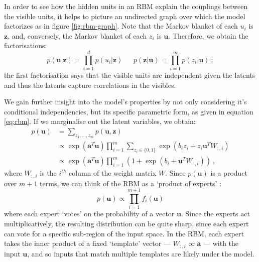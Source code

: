 \documentclass[11pt, oneside]{article}
\renewcommand{\u}{{\mathbf u}}
\newcommand{\z}{{\mathbf z}}
\theoremstyle{definition}
\begin{document}
In order to see how the hidden units in an RBM explain the couplings between the visible units, it helps to picture an undirected graph over which the model factorizes as in figure \ref{fig:rbm-graph}. Note that the Markov blanket of each $u_i$ is $\z$, and, conversely, the Markov blanket of each $z_i$ is $\u$. Therefore, we obtain the factorisations:
\begin{equation}
    p(\u | \z) = \prod_{i=1}^d p(u_i | \z)  \ \ \ \ \ \ \ p(\z | \u) = \prod_{i=1}^m p(z_i | \u) \ ;
    \label{eq: rbm conditional indpendicies}
\end{equation}
the first factorisation says that the visible units are independent given the latents and thus the latents capture correlations in the visibles.

We gain further insight into the model's properties by not only considering it's conditional independencies, but its specific parametric form, as given in equation \ref{eq:rbm}. If we marginalise out the latent variables, we obtain:
\begin{align}
    p(\u) &= \sum_{z_1, ..., z_m} p(\u, \z) \\
          &\propto \exp(\textbf{a}^T\u) \prod_{i=1}^m \sum_{z_i \in \{0, 1\}} \exp(b_i z_i + z_i \u^T W_{:, i}) \\
          &\propto \exp(\textbf{a}^T\u) \prod_{i=1}^m (1 + \exp(b_i + \u^T W_{:, i})) \ ,
          \label{eq:marginal of rbm}
\end{align}
where $W_{:, i}$ is the $i^{th}$ column of the weight matrix $W$. Since $p(\u)$ is a product over $m+1$ terms, we can think of the RBM as a `product of experts' \citep{hinton2006training}:
\begin{equation}
    p(\u) \propto \prod_{i=1}^{m+1} f_i(\u)
\end{equation}
where each expert `votes' on the probability of a vector $\u$. Since the experts act multiplicatively, the resulting distribution can be quite sharp, since each expert can vote for a specific sub-region of the input space. In the RBM, each expert takes the inner product of a fixed `template' vector --- $W_{:,i}$ or $\textbf{a}$ --- with the input $\u$, and so inputs that match multiple templates are likely under the model.

\end{document}
